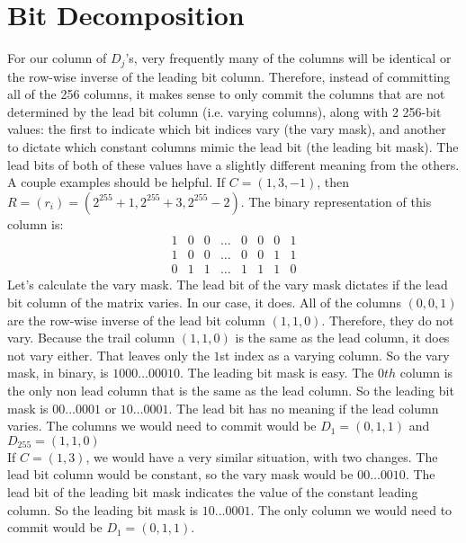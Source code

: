\documentclass[11pt]{article}
\begin{document}
\section{Bit Decomposition}
For our column of $D_j$'s, very frequently many of the columns will be identical or the row-wise inverse of the leading bit column. 
Therefore, instead of committing all of the 256 columns, it makes sense to only commit the columns that are not determined by the lead bit column (i.e. varying columns), 
along with 2 256-bit values: the first to indicate which bit indices vary (the vary mask), 
and another to dictate which constant columns mimic the lead bit (the leading bit mask). 
The lead bits of both of these values have a slightly different meaning from the others. 
A couple examples should be helpful. If $C=(1, 3, -1)$, then $R=(r_i)=(2^{255}+1,2^{255}+3,2^{255}-2)$. 
The binary representation of this column is:
$$\begin{array}{cccccccc}
1 & 0 & 0 & \ldots & 0 & 0 & 0 & 1\\
1 & 0 & 0 & \ldots & 0 & 0 & 1 & 1\\
0 & 1 & 1 & \ldots & 1 & 1 & 1 & 0
\end{array}$$
Let's calculate the vary mask. The lead bit of the vary mask dictates if the lead bit column of the matrix varies. 
In our case, it does. All of the columns $(0,0,1)$ are the row-wise inverse of the lead bit column $(1,1,0)$. 
Therefore, they do not vary. Because the trail column $(1,1,0)$ is the same as the lead column, 
it does not vary either. That leaves only the $1$st index as a varying column. So the vary mask, 
in binary, is $1000\ldots00010$. The leading bit mask is easy. The $0th$ column is the only non lead column that is the same as the lead column. 
So the leading bit mask is $00\ldots0001$ or $10\ldots0001$. The lead bit has no meaning if the lead column varies. 
The columns we would need to commit would be $D_{1}=(0,1,1)$ and $D_{255}=(1,1,0)$\\
If $C=(1,3)$, we would have a very similar situation, with two changes. The lead bit column would be constant, 
so the vary mask would be $00\ldots0010$. The lead bit of the leading bit mask indicates the value of the constant leading column. 
So the leading bit mask is $10\ldots0001$. The only column we would need to commit would be $D_{1}=(0,1,1)$.
\end{document}
